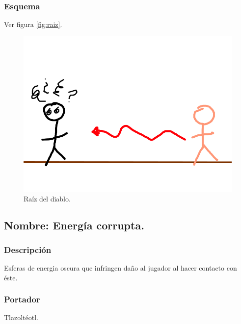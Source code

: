 \documentclass[11pt,letterpaper]{article}
\begin{document}
\subsubsection{Esquema}
			Ver figura \ref{fig:raiz}.
			\begin{figure}
				\centering
				\includegraphics[height=0.2 \textheight]{Imagenes/raiz}
				\caption{Raíz del diablo.}
				\label{fig:Raíz}
			\end{figure}
\subsection{Nombre: Energía corrupta.}
\subsubsection{Descripción}
Esferas de energia oscura que infringen daño al jugador al hacer contacto con éste.
\subsubsection{Portador}
Tlazoltéotl.
\end{document}
